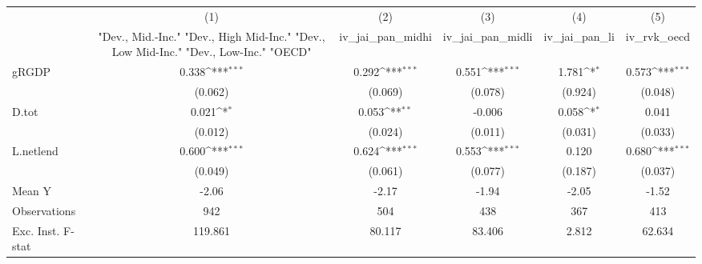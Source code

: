 {
\def\sym#1{\ifmmode^{#1}\else\(^{#1}\)\fi}
\begin{tabular}{l*{5}{c}}
\toprule
            &\multicolumn{1}{c}{(1)}&\multicolumn{1}{c}{(2)}&\multicolumn{1}{c}{(3)}&\multicolumn{1}{c}{(4)}&\multicolumn{1}{c}{(5)}\\
            &\multicolumn{1}{c}{ "Dev., Mid.-Inc." "Dev., High Mid-Inc." "Dev., Low Mid-Inc." "Dev., Low-Inc." "OECD" }&\multicolumn{1}{c}{iv\_jai\_pan\_midhi}&\multicolumn{1}{c}{iv\_jai\_pan\_midli}&\multicolumn{1}{c}{iv\_jai\_pan\_li}&\multicolumn{1}{c}{iv\_rvk\_oecd}\\
\midrule
gRGDP       &       0.338\sym{***}&       0.292\sym{***}&       0.551\sym{***}&       1.781\sym{*}  &       0.573\sym{***}\\
            &     (0.062)         &     (0.069)         &     (0.078)         &     (0.924)         &     (0.048)         \\
\addlinespace
D.tot       &       0.021\sym{*}  &       0.053\sym{**} &      -0.006         &       0.058\sym{*}  &       0.041         \\
            &     (0.012)         &     (0.024)         &     (0.011)         &     (0.031)         &     (0.033)         \\
\addlinespace
L.netlend   &       0.600\sym{***}&       0.624\sym{***}&       0.553\sym{***}&       0.120         &       0.680\sym{***}\\
            &     (0.049)         &     (0.061)         &     (0.077)         &     (0.187)         &     (0.037)         \\
\midrule
Mean Y      &       -2.06         &       -2.17         &       -1.94         &       -2.05         &       -1.52         \\
Observations&         942         &         504         &         438         &         367         &         413         \\
Exc. Inst. F-stat&     119.861         &      80.117         &      83.406         &       2.812         &      62.634         \\
\bottomrule
\end{tabular}
}
